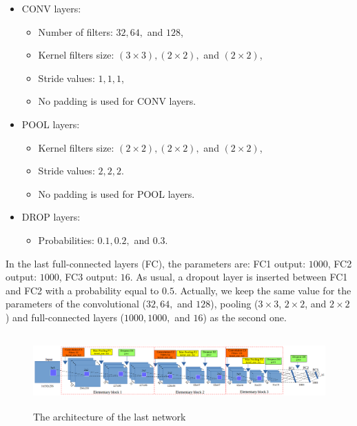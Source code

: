\documentclass{article} %
\begin{document}
\begin{multicols}{2}
\begin{itemize}[nosep,label=\footnotesize$\bullet$]
\item CONV layers:
		\begin{itemize}[nosep]
			\item Number of filters: $32, 64,$ and $128$,
			\item Kernel filters size: $(3 \times 3), (2 \times 2),$ and $(2 \times 2)$,
			\item Stride values: $1, 1, 1$,
			\item No padding is used for CONV layers.
		\end{itemize}			
	\item POOL layers:
		\begin{itemize}[nosep]
			\item Kernel filters size: $(2 \times 2), (2 \times 2),$ and $(2 \times 2)$,
			\item Stride values: $2, 2, 2$.
			\item No padding is used for POOL layers.
		\end{itemize}
	\item DROP layers: 
		\begin{itemize}[nosep]
			\item Probabilities: $0.1, 0.2, $ and $0.3$.
		\end{itemize}
	\end{itemize}
In the last full-connected layers (FC), the parameters are: FC1 output:
$1000$, FC2 output: $1000$, FC3  output: $16$. As usual, a dropout layer is
inserted between FC1 and FC2 with a probability equal to $0.5$.
Actually, we keep the same value for the parameters of the convolutional ($32, 64,$ and $128$), pooling ($3 \times 3$, $2 \times 2$, and $2 \times 2$) and full-connected layers ($1000, 1000,$ and $16$) as the second one.

\begin{figure}[t]
	\centerline{\includegraphics[height=1.1in]{images/arch_model.png}}
	\caption{\footnotesize{The architecture of the last network}}
	\label{figarch}
\end{figure}


\end{multicols}
\end{document}

